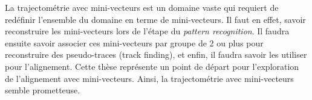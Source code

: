   \medskip
  
  La trajectom\'etrie avec mini-vecteurs est un domaine vaste qui requiert de red\'efinir l'ensemble du domaine en terme de mini-vecteurs. Il faut en effet, savoir reconstruire les mini-vecteurs lors de l'\'etape du \textit{pattern recognition}. Il faudra ensuite savoir associer ces mini-vecteurs par groupe de 2 ou plus pour reconstruire des pseudo-traces (track finding), et enfin, il faudra savoir les utiliser pour l'alignement. Cette th\`ese repr\'esente un point de d\'epart pour l'exploration de l'alignement avec mini-vecteurs. Ainsi, la trajectom\'etrie avec mini-vecteurs semble prometteuse.
  

